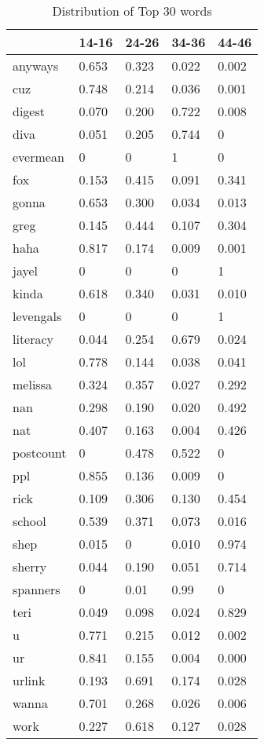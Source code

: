 \documentclass[11pt]{article}
\begin{document}
\begin{table}[]
\centering
\begin{tabular}{|l|l|l|l|l|}
\hline
          & 14-16 & 24-26 & 34-36 & 44-46 \\ \hline
anyways   & 0.653 & 0.323 & 0.022 & 0.002 \\ \hline
cuz       & 0.748 & 0.214 & 0.036 & 0.001 \\ \hline
digest    & 0.070 & 0.200 & 0.722 & 0.008 \\ \hline
diva      & 0.051 & 0.205 & 0.744 & 0     \\ \hline
evermean  & 0     & 0     & 1     & 0     \\ \hline
fox       & 0.153 & 0.415 & 0.091 & 0.341 \\ \hline
gonna     & 0.653 & 0.300 & 0.034 & 0.013 \\ \hline
greg      & 0.145 & 0.444 & 0.107 & 0.304 \\ \hline
haha      & 0.817 & 0.174 & 0.009 & 0.001 \\ \hline
jayel     & 0     & 0     & 0     & 1     \\ \hline
kinda     & 0.618 & 0.340 & 0.031 & 0.010 \\ \hline
levengals & 0     & 0     & 0     & 1     \\ \hline
literacy  & 0.044 & 0.254 & 0.679 & 0.024 \\ \hline
lol       & 0.778 & 0.144 & 0.038 & 0.041 \\ \hline
melissa   & 0.324 & 0.357 & 0.027 & 0.292 \\ \hline
nan       & 0.298 & 0.190 & 0.020 & 0.492 \\ \hline
nat       & 0.407 & 0.163 & 0.004 & 0.426 \\ \hline
postcount & 0     & 0.478 & 0.522 & 0     \\ \hline
ppl       & 0.855 & 0.136 & 0.009 & 0     \\ \hline
rick      & 0.109 & 0.306 & 0.130 & 0.454 \\ \hline
school    & 0.539 & 0.371 & 0.073 & 0.016 \\ \hline
shep      & 0.015 & 0     & 0.010 & 0.974 \\ \hline
sherry    & 0.044 & 0.190 & 0.051 & 0.714 \\ \hline
spanners  & 0     & 0.01  & 0.99  & 0     \\ \hline
teri      & 0.049 & 0.098 & 0.024 & 0.829 \\ \hline
u         & 0.771 & 0.215 & 0.012 & 0.002 \\ \hline
ur        & 0.841 & 0.155 & 0.004 & 0.000 \\ \hline
urlink    & 0.193 & 0.691 & 0.174 & 0.028 \\ \hline
wanna     & 0.701 & 0.268 & 0.026 & 0.006 \\ \hline
work      & 0.227 & 0.618 & 0.127 & 0.028 \\ \hline
\end{tabular}
\caption{Distribution of Top 30 words}
\label{table1}
\end{table}
\end{document}
